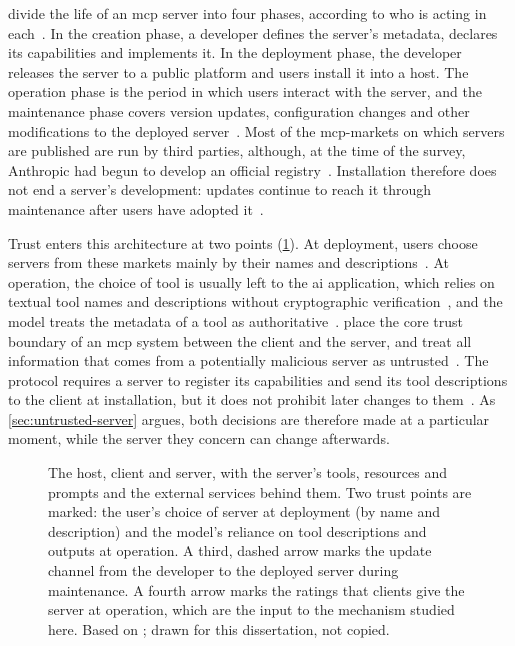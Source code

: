 \textcite{Hou2026} divide the life of an \gls{mcp} server into four phases, according to who is acting in each~\cite[p.~7]{Hou2026}. In the creation phase, a developer defines the server's metadata, declares its capabilities and implements it. In the deployment phase, the developer releases the server to a public platform and users install it into a host. The operation phase is the period in which users interact with the server, and the maintenance phase covers version updates, configuration changes and other modifications to the deployed server~\cite[p.~7]{Hou2026}. Most of the \glspl{mcp-market} on which servers are published are run by third parties, although, at the time of the survey, Anthropic had begun to develop an official registry~\cite[p.~8]{Hou2026}. Installation therefore does not end a server's development: updates continue to reach it through maintenance after users have adopted it~\cite[p.~9]{Hou2026}.

Trust enters this architecture at two points (\cref{fig:mcp-trust}). At deployment, users choose servers from these markets mainly by their names and descriptions~\cite[p.~15]{Hou2026}. At operation, the choice of tool is usually left to the \gls{ai} application, which relies on textual tool names and descriptions without cryptographic verification~\cite[p.~17]{Hou2026}, and the model treats the metadata of a tool as authoritative~\cite[p.~18]{Hou2026}. \textcite{Song2026} place the core trust boundary of an \gls{mcp} system between the client and the server, and treat all information that comes from a potentially malicious server as untrusted~\cite[p.~2412]{Song2026}. The protocol requires a server to register its capabilities and send its tool descriptions to the client at installation, but it does not prohibit later changes to them~\cite[p.~2414]{Song2026}. As \cref{sec:untrusted-server} argues, both decisions are therefore made at a particular moment, while the server they concern can change afterwards.

\begin{figure}[tb]
  \centering
  \caption[The  host, client and server, and the points at which trust enters]{The  host, client and server, with the server's tools, resources and prompts and the external services behind them. Two trust points are marked: the user's choice of server at deployment (by name and description) and the model's reliance on tool descriptions and outputs at operation. A third, dashed arrow marks the update channel from the developer to the deployed server during maintenance. A fourth arrow marks the ratings that clients give the server at operation, which are the input to the mechanism studied here. Based on \cites[Figs.~2--3]{Hou2026}[p.~2412]{Song2026}; drawn for this dissertation, not copied.}\label{fig:mcp-trust}
\end{figure}

